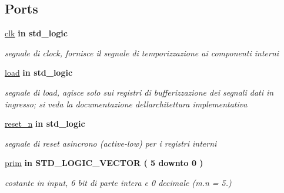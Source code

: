 \subsection*{Ports}
 \begin{DoxyCompactItemize}
\item 
\hyperlink{group___linear_regression_ga4a4609c199d30b3adebbeb3a01276ec5}{clk}  {\bfseries {\bfseries \textcolor{vhdlchar}{in}\textcolor{vhdlchar}{ }}} {\bfseries \textcolor{vhdlchar}{std\+\_\+logic}\textcolor{vhdlchar}{ }} 
\begin{DoxyCompactList}\small\item\em segnale di clock, fornisce il segnale di temporizzazione ai componenti interni \end{DoxyCompactList}\item 
\hyperlink{group___linear_regression_gaba761f7740d0b6257a0e283b3734ddbf}{load}  {\bfseries {\bfseries \textcolor{vhdlchar}{in}\textcolor{vhdlchar}{ }}} {\bfseries \textcolor{vhdlchar}{std\+\_\+logic}\textcolor{vhdlchar}{ }} 
\begin{DoxyCompactList}\small\item\em segnale di load, agisce solo sui registri di bufferizzazione dei segnali dati in ingresso; si veda la documentazione dell\textquotesingle{}architettura implementativa \end{DoxyCompactList}\item 
\hyperlink{group___linear_regression_ga446ea52ed8c4a84181a47d9165ce41a5}{reset\+\_\+n}  {\bfseries {\bfseries \textcolor{vhdlchar}{in}\textcolor{vhdlchar}{ }}} {\bfseries \textcolor{vhdlchar}{std\+\_\+logic}\textcolor{vhdlchar}{ }} 
\begin{DoxyCompactList}\small\item\em segnale di reset asincrono (active-\/low) per i registri interni \end{DoxyCompactList}\item 
\hyperlink{group___linear_regression_ga334647776cbf92a6f58a9e709678a597}{prim}  {\bfseries {\bfseries \textcolor{vhdlchar}{in}\textcolor{vhdlchar}{ }}} {\bfseries \textcolor{vhdlchar}{S\+T\+D\+\_\+\+L\+O\+G\+I\+C\+\_\+\+V\+E\+C\+T\+OR}\textcolor{vhdlchar}{ }\textcolor{vhdlchar}{(}\textcolor{vhdlchar}{ }\textcolor{vhdlchar}{ } \textcolor{vhdldigit}{5} \textcolor{vhdlchar}{ }\textcolor{vhdlchar}{downto}\textcolor{vhdlchar}{ }\textcolor{vhdlchar}{ } \textcolor{vhdldigit}{0} \textcolor{vhdlchar}{ }\textcolor{vhdlchar}{)}\textcolor{vhdlchar}{ }} 
\begin{DoxyCompactList}\small\item\em costante in input, 6 bit di parte intera e 0 decimale (m.\+n = 5.) \end{DoxyCompactList}\item 

\end{DoxyCompactItemize}
